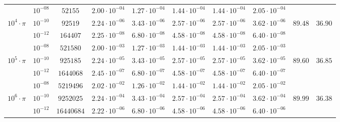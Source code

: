 \documentclass[a4paper,10pt]{article}
\begin{document}
\begin{tabular}{|c|c|c|c|c|c|c|c|c|c|}
\cline{1-10}
&$10^{-08}$&$ 52155$&$  2.00\cdot 10^{-04}$&$  1.27\cdot 10^{-04}$&$  1.44\cdot 10^{-04}$&$  1.44\cdot 10^{-04}$&$  2.05\cdot 10^{-04}$& &\\
\cline{2-8}
$10^4 \cdot \pi$&$10^{-10}$&$ 92519$&$  2.24\cdot 10^{-06}$&$  3.43\cdot 10^{-06}$&$  2.57\cdot 10^{-06}$&$  2.57\cdot 10^{-06}$&$  3.62\cdot 10^{-06}$&$89.48$&$36.90$\\
\cline{2-8}
&$10^{-12}$&$ 164407$&$  2.25\cdot 10^{-08}$&$  6.80\cdot 10^{-08}$&$  4.58\cdot 10^{-08}$&$  4.58\cdot 10^{-08}$&$  6.40\cdot 10^{-08}$& &\\
\cline{1-10}
&$10^{-08}$&$ 521580$&$  2.00\cdot 10^{-03}$&$  1.27\cdot 10^{-03}$&$  1.44\cdot 10^{-03}$&$  1.44\cdot 10^{-03}$&$  2.05\cdot 10^{-03}$& &\\
\cline{2-8}
$10^5 \cdot \pi$&$10^{-10}$&$ 925185$&$  2.24\cdot 10^{-05}$&$  3.43\cdot 10^{-05}$&$  2.57\cdot 10^{-05}$&$  2.57\cdot 10^{-05}$&$  3.62\cdot 10^{-05}$&$89.60$&$36.85$\\
\cline{2-8}
&$10^{-12}$&$ 1644068$&$  2.45\cdot 10^{-07}$&$  6.80\cdot 10^{-07}$&$  4.58\cdot 10^{-07}$&$  4.58\cdot 10^{-07}$&$  6.40\cdot 10^{-07}$& &\\
\cline{1-10}
&$10^{-08}$&$ 5219496$&$  2.02\cdot 10^{-02}$&$  1.26\cdot 10^{-02}$&$  1.44\cdot 10^{-02}$&$  1.44\cdot 10^{-02}$&$  2.05\cdot 10^{-02}$& &\\
\cline{2-8}
$10^6 \cdot \pi$&$10^{-10}$&$ 9252025$&$  2.24\cdot 10^{-04}$&$  3.43\cdot 10^{-04}$&$  2.57\cdot 10^{-04}$&$  2.57\cdot 10^{-04}$&$  3.62\cdot 10^{-04}$&$89.99$&$36.38$\\
\cline{2-8}
&$10^{-12}$&$ 16440684$&$  2.22\cdot 10^{-06}$&$  6.80\cdot 10^{-06}$&$  4.58\cdot 10^{-06}$&$  4.58\cdot 10^{-06}$&$  6.40\cdot 10^{-06}$& &\\
\cline{1-10}
\end{tabular}
\end{document}

